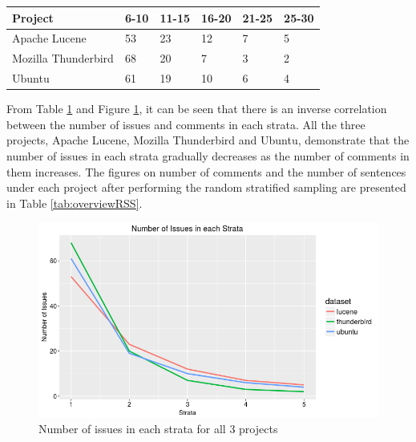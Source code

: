 \documentclass[a4paper,12pt,twoside]{report}
\begin{document}
\begin{table} %
    \centering
    \begin{adjustbox}{max width=\columnwidth}
    \def\arraystretch{1} %
    \begin{tabular}{p{4cm} p{2cm} p{2cm} p{2cm} p{2cm} p{2cm}}
        \toprule
        \textbf{Project} & \textbf{6-10} & \textbf{11-15} & \textbf{16-20} & \textbf{21-25} & \textbf{25-30}\\
        \midrule
			Apache Lucene & 53 & 23 & 12 & 7 & 5\\
			Mozilla Thunderbird & 68 & 20 & 7 & 3 & 2\\ 
			Ubuntu & 61 & 19 & 10 & 6 & 4\\
        \midrule
    \end{tabular}
    \end{adjustbox}
    \label{tab:strataProportion}
\end{table}

From Table \ref{tab:strataProportion} and Figure \ref{fig:multilineStrata}, it can be seen that there is an inverse correlation between the number of issues and comments in each strata. All the three projects, Apache Lucene, Mozilla Thunderbird and Ubuntu, demonstrate that the number of issues in each strata gradually decreases as the number of comments in them increases. The figures on number of comments and the number of sentences under each project after performing the random stratified sampling are presented in Table \ref{tab:overviewRSS}. 
\newline 
\begin{figure}[h] %
    \centering
    \includegraphics[width=12cm]{rss-multi-line-plot}
    \caption{Number of issues in each strata for all 3 projects}
    \label{fig:multilineStrata}
\end{figure}
\newline 
\end{document}
